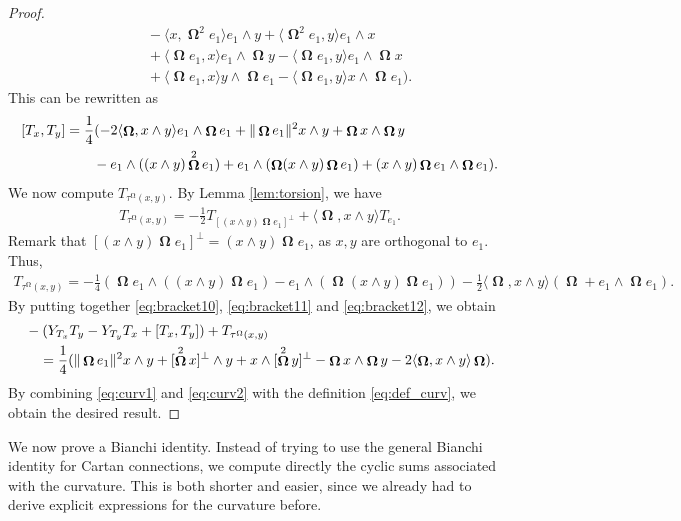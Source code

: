 \documentclass[12pt]{amsart}
\numberwithin{numbering}{section}
\theoremstyle{plain}
\theoremstyle{definition}
\theoremstyle{remark}
\numberwithin{equation}{section}
\DeclareMathOperator{\oo}{\mathbf{\Omega}}
\DeclareMathOperator{\mg}{\Omega}
\begin{document}
\begin{proof}
\begin{align*}
&\quad \quad - \langle x, \oo^2 e_1 \rangle e_1 \wedge y + \langle \oo^2 e_1, y \rangle e_1 \wedge x \\ 
&\quad \quad + \langle \oo e_1, x \rangle e_1 \wedge \oo y - \langle \oo e_1, y \rangle e_1 \wedge \oo x \\ 
&\quad \quad + \langle \oo e_1, x \rangle y \wedge \oo e_1 - \langle \oo e_1, y \rangle x \wedge \oo e_1).
\end{align*}
This can be rewritten as
\begin{align} \label{eq:bracket11}
[T_x, T_y] &= \frac{1}{4} (-2 \langle \oo, x \wedge y \rangle e_1 \wedge \oo e_1 + \Vert \oo e_1 \Vert^2 x \wedge y + \oo x \wedge \oo y \\ 
&\quad \quad - e_1 \wedge ((x \wedge y) \oo^2 e_1) + e_1 \wedge (\oo (x \wedge y) \oo e_1) + (x \wedge y) \oo e_1 \wedge \oo e_1). \notag 
\end{align}
We now compute $T_{\tau^{\mg}(x, y)}$. By Lemma \ref{lem:torsion}, we have 
\begin{align*}
T_{\tau^{\mg}(x, y)} = - \frac{1}{2} T_{[(x \wedge y) \oo e_1]^\perp} + \langle \oo, x \wedge y \rangle T_{e_1}.
\end{align*}
Remark that $[(x \wedge y) \oo e_1]^\perp = (x \wedge y) \oo e_1$, as $x, y$ are orthogonal to $e_1$. Thus, 
\begin{align} \label{eq:bracket12}
T_{\tau^{\mg}(x, y)} 
= - \frac{1}{4} (\oo e_1 \wedge ((x \wedge y) \oo e_1) - e_1 \wedge (\oo (x \wedge y) \oo e_1)) - \frac{1}{2} \langle \oo, x \wedge y \rangle (\oo + e_1 \wedge \oo e_1).
\end{align}
By putting together \eqref{eq:bracket10}, \eqref{eq:bracket11} and \eqref{eq:bracket12}, we obtain 
\begin{align} \label{eq:curv2}
&- (Y_{T_x} T_y - Y_{T_y} T_x + [T_x, T_y]) + T_{\tau^{\mg}(x, y)} \\
&\quad = \frac{1}{4} (\Vert \oo e_1 \Vert^2 x \wedge y + [\oo^2 x]^\perp \wedge y + x \wedge [\oo^2 y]^\perp - \oo x \wedge \oo y - 2 \langle \oo, x \wedge y \rangle \oo). \notag
\end{align}
By combining \eqref{eq:curv1} and \eqref{eq:curv2} with the definition \eqref{eq:def_curv}, we obtain the desired result.
\end{proof}


\bigskip

We now prove a Bianchi identity. Instead of trying to use the general Bianchi identity for Cartan connections, we compute directly the cyclic sums associated with the curvature. This is both shorter and easier, since we already had to derive explicit expressions for the curvature before.
\end{document}
